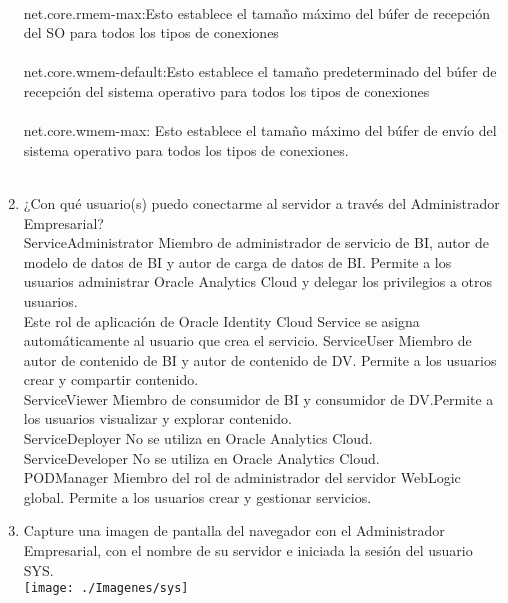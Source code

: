 \begin{enumerate}[1.]
	\\ net.core.rmem-max:Esto establece el tamaño máximo del búfer de recepción del SO para todos los tipos de conexiones\\
	\\ net.core.wmem-default:Esto establece el tamaño predeterminado del búfer de recepción del sistema operativo para todos los tipos de conexiones\\
	\\net.core.wmem-max:
	Esto establece el tamaño máximo del búfer de envío del sistema operativo para todos los tipos de conexiones.\\
	\\


\item ¿Con qué usuario(s) puedo conectarme al servidor a través del Administrador Empresarial? \\

ServiceAdministrator
Miembro de administrador de servicio de BI, autor de modelo de datos de BI y autor de carga de datos de BI. Permite a los usuarios administrar Oracle Analytics Cloud y delegar los privilegios a otros usuarios.\\
Este rol de aplicación de Oracle Identity Cloud Service se asigna automáticamente al usuario que crea el servicio.
ServiceUser
Miembro de autor de contenido de BI y autor de contenido de DV.
Permite a los usuarios crear y compartir contenido.\\
ServiceViewer
Miembro de consumidor de BI y consumidor de DV.Permite a los usuarios visualizar y explorar contenido.\\
ServiceDeployer
No se utiliza en Oracle Analytics Cloud.\\
ServiceDeveloper
No se utiliza en Oracle Analytics Cloud.\\
PODManager
Miembro del rol de administrador del servidor WebLogic global.
Permite a los usuarios crear y gestionar servicios.
\item Capture una imagen de pantalla del navegador con el Administrador Empresarial, con el nombre de su servidor e iniciada la sesión del usuario SYS. \\
\texttt{[image: ./Imagenes/sys]}

    



\end{enumerate} 